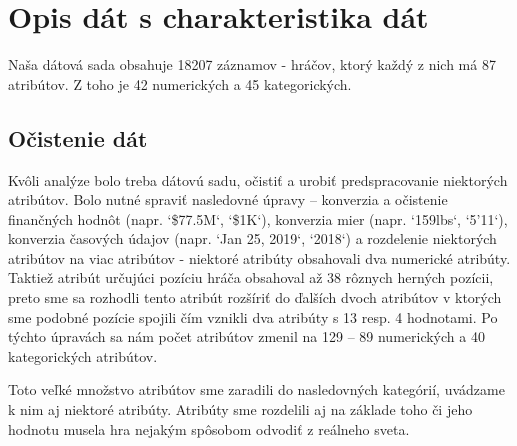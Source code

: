 \documentclass[runningheads]{llncs}
\begin{document}
\section{Opis dát s charakteristika dát}
 
 
    
    

 
Naša dátová sada obsahuje 18207 záznamov - hráčov, ktorý každý z nich má 87 atribútov. Z toho je 42 numerických a 45 kategorických.
 
\subsection{Očistenie dát} \label{ocistenie_dat}
 
Kvôli analýze bolo treba dátovú sadu, očistiť a urobiť predspracovanie niektorých atribútov. Bolo nutné spraviť nasledovné úpravy -- konverzia a očistenie finančných hodnôt (napr. `\$77.5M`, `\$1K`), konverzia mier (napr. `159lbs`, `5'11`), konverzia časových údajov (napr. `Jan 25, 2019`, `2018`) a rozdelenie niektorých atribútov na viac atribútov - niektoré atribúty obsahovali dva numerické atribúty. Taktiež atribút určujúci pozíciu hráča obsahoval až 38 rôznych herných pozícii, preto sme sa rozhodli tento atribút rozšíriť do ďalších dvoch atribútov v ktorých sme podobné pozície spojili čím vznikli dva atribúty s 13 resp. 4 hodnotami. Po týchto úpravách sa nám počet atribútov zmenil na 129 -- 89 numerických a 40 kategorických atribútov.

Toto veľké množstvo atribútov sme zaradili do nasledovných kategórií, uvádzame k nim aj niektoré atribúty. Atribúty sme rozdelili aj na základe toho či jeho hodnotu musela hra nejakým spôsobom odvodiť z reálneho sveta.
\end{document}

